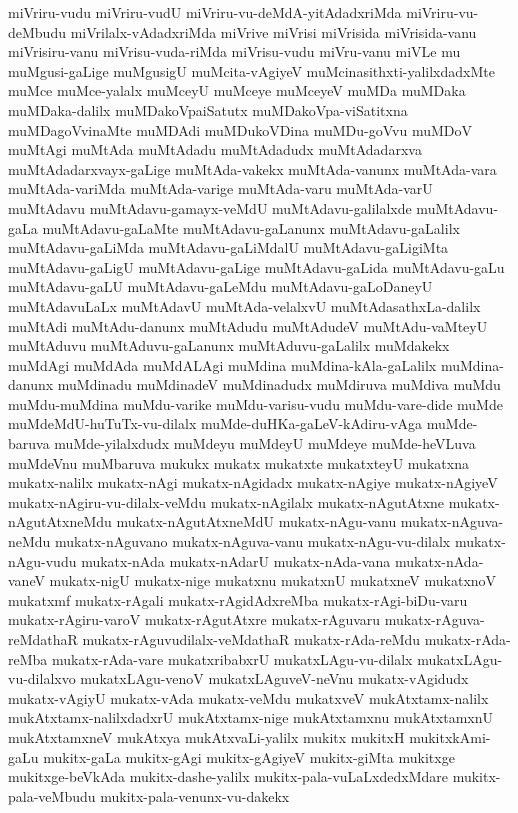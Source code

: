 {miVriru-vudu
miVriru-vudU
miVriru-vu-deMdA-yitAdadxriMda
miVriru-vu-deMbudu
miVrilalx-vAdadxriMda
miVrive
miVrisi
miVrisida
miVrisida-vanu
miVrisiru-vanu
miVrisu-vuda-riMda
miVrisu-vudu
miVru-vanu
miVLe
mu
muMgusi-gaLige
muMgusigU
muMcita-vAgiyeV
muMcinasithxti-yalilxdadxMte
muMce
muMce-yalalx
muMceyU
muMceye
muMceyeV
muMDa
muMDaka
muMDaka-dalilx
muMDakoVpaiSatutx
muMDakoVpa-viSatitxna
muMDagoVvinaMte
muMDAdi
muMDukoVDina
muMDu-goVvu
muMDoV
muMtAgi
muMtAda
muMtAdadu
muMtAdadudx
muMtAdadarxva
muMtAdadarxvayx-gaLige
muMtAda-vakekx
muMtAda-vanunx
muMtAda-vara
muMtAda-variMda
muMtAda-varige
muMtAda-varu
muMtAda-varU
muMtAdavu
muMtAdavu-gamayx-veMdU
muMtAdavu-galilalxde
muMtAdavu-gaLa
muMtAdavu-gaLaMte
muMtAdavu-gaLanunx
muMtAdavu-gaLalilx
muMtAdavu-gaLiMda
muMtAdavu-gaLiMdalU
muMtAdavu-gaLigiMta
muMtAdavu-gaLigU
muMtAdavu-gaLige
muMtAdavu-gaLida
muMtAdavu-gaLu
muMtAdavu-gaLU
muMtAdavu-gaLeMdu
muMtAdavu-gaLoDaneyU
muMtAdavuLaLx
muMtAdavU
muMtAda-velalxvU
muMtAdasathxLa-dalilx
muMtAdi
muMtAdu-danunx
muMtAdudu
muMtAdudeV
muMtAdu-vaMteyU
muMtAduvu
muMtAduvu-gaLanunx
muMtAduvu-gaLalilx
muMdakekx
muMdAgi
muMdAda
muMdALAgi
muMdina
muMdina-kAla-gaLalilx
muMdina-danunx
muMdinadu
muMdinadeV
muMdinadudx
muMdiruva
muMdiva
muMdu
muMdu-muMdina
muMdu-varike
muMdu-varisu-vudu
muMdu-vare-dide
muMde
muMdeMdU-huTuTx-vu-dilalx
muMde-duHKa-gaLeV-kAdiru-vAga
muMde-baruva
muMde-yilalxdudx
muMdeyu
muMdeyU
muMdeye
muMde-heVLuva
muMdeVnu
muMbaruva
mukukx
mukatx
mukatxte
mukatxteyU
mukatxna
mukatx-nalilx
mukatx-nAgi
mukatx-nAgidadx
mukatx-nAgiye
mukatx-nAgiyeV
mukatx-nAgiru-vu-dilalx-veMdu
mukatx-nAgilalx
mukatx-nAgutAtxne
mukatx-nAgutAtxneMdu
mukatx-nAgutAtxneMdU
mukatx-nAgu-vanu
mukatx-nAguva-neMdu
mukatx-nAguvano
mukatx-nAguva-vanu
mukatx-nAgu-vu-dilalx
mukatx-nAgu-vudu
mukatx-nAda
mukatx-nAdarU
mukatx-nAda-vana
mukatx-nAda-vaneV
mukatx-nigU
mukatx-nige
mukatxnu
mukatxnU
mukatxneV
mukatxnoV
mukatxmf
mukatx-rAgali
mukatx-rAgidAdxreMba
mukatx-rAgi-biDu-varu
mukatx-rAgiru-varoV
mukatx-rAgutAtxre
mukatx-rAguvaru
mukatx-rAguva-reMdathaR
mukatx-rAguvudilalx-veMdathaR
mukatx-rAda-reMdu
mukatx-rAda-reMba
mukatx-rAda-vare
mukatxribabxrU
mukatxLAgu-vu-dilalx
mukatxLAgu-vu-dilalxvo
mukatxLAgu-venoV
mukatxLAguveV-neVnu
mukatx-vAgidudx
mukatx-vAgiyU
mukatx-vAda
mukatx-veMdu
mukatxveV
mukAtxtamx-nalilx
mukAtxtamx-nalilxdadxrU
mukAtxtamx-nige
mukAtxtamxnu
mukAtxtamxnU
mukAtxtamxneV
mukAtxya
mukAtxvaLi-yalilx
mukitx
mukitxH
mukitxkAmi-gaLu
mukitx-gaLa
mukitx-gAgi
mukitx-gAgiyeV
mukitx-giMta
mukitxge
mukitxge-beVkAda
mukitx-dashe-yalilx
mukitx-pala-vuLaLxdedxMdare
mukitx-pala-veMbudu
mukitx-pala-venunx-vu-dakekx
}
